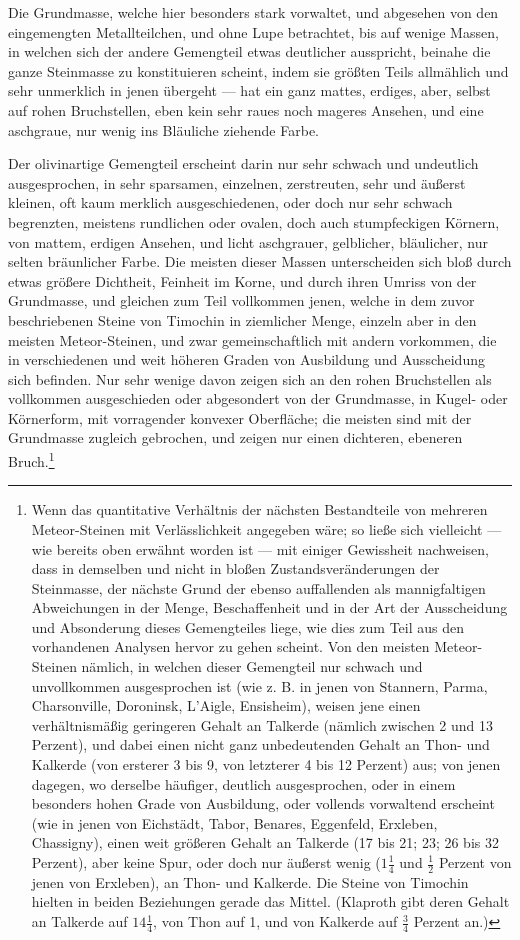 \documentclass[a4paper, 11pt, oneside, german]{article}
\begin{document}
Die Grundmasse, welche hier besonders stark vorwaltet, und abgesehen von den eingemengten Metallteilchen, und ohne Lupe betrachtet, bis auf wenige Massen, in welchen sich der andere Gemengteil etwas deutlicher ausspricht, beinahe die ganze Steinmasse zu konstituieren scheint, indem sie größten Teils allmählich und sehr unmerklich in jenen übergeht --- hat ein ganz mattes, erdiges, aber, selbst auf rohen Bruchstellen, eben kein sehr raues noch mageres Ansehen, und eine aschgraue, nur wenig ins Bläuliche ziehende Farbe.

Der olivinartige Gemengteil erscheint darin nur sehr schwach und undeutlich ausgesprochen, in sehr sparsamen, einzelnen, zerstreuten, sehr und äußerst kleinen, oft kaum merklich ausgeschiedenen, oder doch nur sehr schwach begrenzten, meistens rundlichen oder ovalen, doch auch stumpfeckigen Körnern, von mattem, erdigen Ansehen, und licht aschgrauer, gelblicher, bläulicher, nur selten bräunlicher Farbe. Die meisten dieser Massen unterscheiden sich bloß durch etwas größere Dichtheit, Feinheit im Korne, und durch ihren Umriss von der Grundmasse, und gleichen zum Teil vollkommen jenen, welche in dem zuvor beschriebenen Steine von Timochin in ziemlicher Menge, einzeln aber in den meisten Meteor-Steinen, und zwar gemeinschaftlich mit andern vorkommen, die in verschiedenen und weit höheren Graden von Ausbildung und Ausscheidung sich befinden. Nur sehr wenige davon zeigen sich an den rohen Bruchstellen als vollkommen ausgeschieden oder abgesondert von der Grundmasse, in Kugel- oder Körnerform, mit vorragender konvexer Oberfläche; die meisten sind mit der Grundmasse zugleich gebrochen, und zeigen nur einen dichteren, ebeneren Bruch.\footnote{Wenn das quantitative Verhältnis der nächsten Bestandteile von mehreren Meteor-Steinen mit Verlässlichkeit angegeben wäre; so ließe sich vielleicht --- wie bereits oben erwähnt worden ist --- mit einiger Gewissheit nachweisen, dass in demselben und nicht in bloßen Zustandsveränderungen der Steinmasse, der nächste Grund der ebenso auffallenden als mannigfaltigen Abweichungen in der Menge, Beschaffenheit und in der Art der Ausscheidung und Absonderung dieses Gemengteiles liege, wie dies zum Teil aus den vorhandenen Analysen hervor zu gehen scheint. Von den meisten Meteor-Steinen nämlich, in welchen dieser Gemengteil nur schwach und unvollkommen ausgesprochen ist (wie z. B. in jenen von Stannern, Parma, Charsonville, Doroninsk, L'Aigle, Ensisheim), weisen jene einen verhältnismäßig geringeren Gehalt an Talkerde (nämlich zwischen 2 und 13 Perzent), und dabei einen nicht ganz unbedeutenden Gehalt an Thon- und Kalkerde (von ersterer 3 bis 9, von letzterer 4 bis 12 Perzent) aus; von jenen dagegen, wo derselbe häufiger, deutlich ausgesprochen, oder in einem besonders hohen Grade von Ausbildung, oder vollends vorwaltend erscheint (wie in jenen von Eichstädt, Tabor, Benares, Eggenfeld, Erxleben, Chassigny), einen weit größeren Gehalt an Talkerde (17 bis 21; 23; 26 bis 32 Perzent), aber keine Spur, oder doch nur äußerst wenig ($1\frac{1}{4}$ und $\frac{1}{2}$ Perzent von jenen von Erxleben), an Thon- und Kalkerde. Die Steine von Timochin hielten in beiden Beziehungen gerade das Mittel. (Klaproth gibt deren Gehalt an Talkerde auf $14\frac{1}{4}$, von Thon auf 1, und von Kalkerde auf $\frac{3}{4}$ Perzent an.)}
\end{document}
